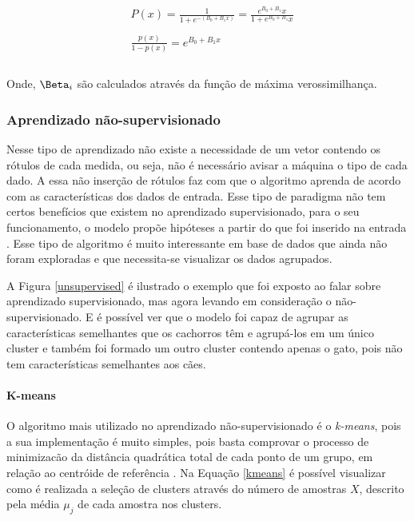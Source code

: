           \begin{equation}\label{eq:LogReg1}
            \begin{aligned}
              & P(x) = \frac{1}{1+e^{-(B_{0}+B_{1}x)}} = \frac{e^{B_{0} + B_{1}}x}{1+e^{B_{0}+B_{1}}x }\\ \\
              & \frac{p(x)}{1-p(x)} = e^{B_{0}+B_{1}x}\\ \\
          \end{aligned} 
          \end{equation}
         
          Onde, $\Beta_{i}$ são calculados através da função de máxima verossimilhança. 

    \subsubsection{Aprendizado não-supervisionado}

          Nesse tipo de aprendizado não existe a necessidade de um vetor contendo os rótulos de cada medida, ou seja, não é 
          necessário avisar a máquina o tipo de cada dado. A essa não inserção de rótulos faz com que o algoritmo aprenda de acordo 
          com as características dos dados de entrada. Esse tipo de paradigma não tem certos benefícios que existem  no aprendizado supervisionado, 
          para o seu funcionamento, o modelo propõe hipóteses a partir do que foi inserido na entrada \cite{bonaccorso2017machine}. Esse tipo de algoritmo 
          é muito interessante em base de dados que ainda não foram exploradas e que necessita-se visualizar os dados agrupados.

          A Figura \ref{unsupervised} é ilustrado o exemplo que foi exposto ao falar sobre aprendizado supervisionado, mas agora levando em consideração o 
          não-supervisionado. E é possível ver que o modelo foi capaz de agrupar as características semelhantes que os cachorros têm e agrupá-los em um
          único cluster e também foi formado um outro cluster contendo apenas o gato, pois não tem características semelhantes aos cães.


          \paragraph{K-means}
          O algoritmo mais utilizado no aprendizado não-supervisionado é o \textit{k-means}, pois a sua implementação é muito simples, pois basta comprovar
          o processo de minimizacão da distância quadrática total de cada ponto de um grupo, em relação ao centróide de referência \cite{macqueen1967some}. Na 
          Equação \ref{kmeans} é possível visualizar como é realizada a seleção de clusters através do número de amostras $X$, descrito pela média $\mu_{j}$ de 
          cada amostra nos clusters. 

